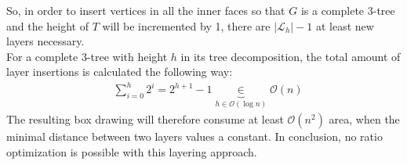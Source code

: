 So, in order to insert vertices in all the inner faces so that $G$ is a complete 3-tree and the height of $T$ will be incremented by 1, there are $|\mathcal{L}_h|-1$ at least new layers necessary.\\
For a complete 3-tree with height $h$ in its tree decomposition, the total amount of layer insertions is calculated the following way:
\begin{align*}
	&\sum_{i=0}^{h} 2^i = 2^{h+1}-1 \underbrace{\in}_{h\in \mathcal{O}(\log n)} \mathcal{O}(n)
\end{align*}
The resulting box drawing will therefore consume at least $\mathcal{O}(n^2)$ area, when the minimal distance between two layers values a constant. In conclusion, no ratio optimization is possible with this layering approach.